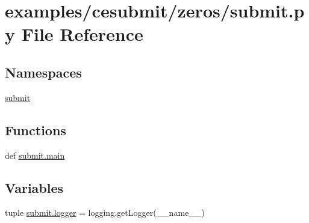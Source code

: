 \section{examples/cesubmit/zeros/submit.py File Reference}
\label{submit_8py}
\subsection*{Namespaces}
\begin{DoxyCompactItemize}
\item 
\hyperlink{namespacesubmit}{submit}
\end{DoxyCompactItemize}
\subsection*{Functions}
\begin{DoxyCompactItemize}
\item 
def \hyperlink{namespacesubmit_a98961a866bb9658af49ce1b4f69739eb}{submit.\-main}
\end{DoxyCompactItemize}
\subsection*{Variables}
\begin{DoxyCompactItemize}
\item 
tuple \hyperlink{namespacesubmit_a4fab93132693ed4c5b9bd03365e28ee7}{submit.\-logger} = logging.\-get\-Logger(\-\_\-\-\_\-name\-\_\-\-\_\-)
\end{DoxyCompactItemize}
